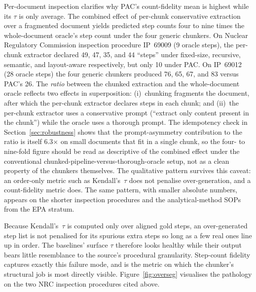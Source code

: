 \documentclass[make,article,submit,oneauthor,pdftex]{Definitions/mdpi}
\begin{document}
Per-document inspection clarifies why PAC's count-fidelity mean is
highest while its $\tau$ is only average. The combined effect of
per-chunk conservative extraction over a fragmented document yields
predicted step counts four to nine times the whole-document oracle's
step count under the four generic chunkers. On Nuclear Regulatory
Commission inspection procedure IP~69009 (9 oracle steps), the
per-chunk extractor declared 49, 47, 35, and 44 ``steps'' under
fixed-size, recursive, semantic, and layout-aware respectively, but
only 10 under PAC. On IP~69012 (28 oracle steps) the four generic
chunkers produced 76, 65, 67, and 83 versus PAC's 26. The
\emph{ratio} between the chunked extraction and the whole-document
oracle reflects two effects in superposition: (i)~chunking fragments
the document, after which the per-chunk extractor declares steps in
each chunk; and (ii)~the per-chunk extractor uses a conservative
prompt (``extract only content present in the chunk'') while the
oracle uses a thorough prompt. The idempotency check in
Section~\ref{sec:robustness} shows that the prompt-asymmetry
contribution to the ratio is itself 6.3$\times$ on small documents
that fit in a single chunk, so the four- to nine-fold figure should
be read as descriptive of the combined effect under the conventional
chunked-pipeline-versus-thorough-oracle setup, not as a clean property
of the chunkers themselves. The qualitative pattern survives this
caveat: an order-only metric such as Kendall's~$\tau$ does not
penalise over-generation, and a count-fidelity metric does. The same pattern, with smaller absolute numbers,
appears on the shorter inspection procedures and the analytical-method
SOPs from the EPA stratum.

Because Kendall's~$\tau$ is computed only over aligned gold steps, an
over-generated step list is not penalised for its spurious extra steps
so long as a few real ones line up in order. The baselines' surface
$\tau$ therefore looks healthy while their output bears little
resemblance to the source's procedural granularity. Step-count fidelity
captures exactly this failure mode, and is the metric on which the
chunker's structural job is most directly visible.
Figure~\ref{fig:overseg} visualises the pathology on the two NRC
inspection procedures cited above.
\end{document}
